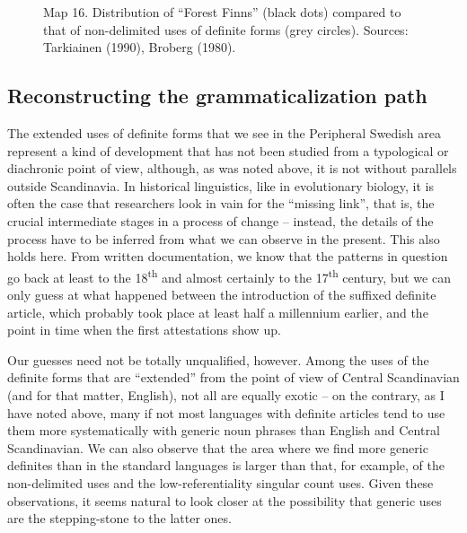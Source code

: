 \begin{figure}[h]
\centering
\begin{minipage}{6.58333in}
\label{bkm:Ref135469955}Map 16. Distribution of “Forest Finns” (black dots) compared to that of non-delimited uses\newline
 of definite forms (grey circles). Sources: Tarkiainen (1990), Broberg (1980).
\end{minipage}
\end{figure}
\clearpage\subsection[Reconstructing the grammaticalization path]{\rmfamily Reconstructing the grammaticalization path}
\label{bkm:Ref154983462}%
The extended uses of definite forms that we see in the Peripheral Swedish area represent a kind of development that has not been studied from a typological or diachronic point of view, although, as was noted above, it is not without parallels outside Scandinavia. In historical linguistics, like in evolutionary biology, it is often the case that researchers look in vain for the “missing link”, that is, the crucial intermediate stages in a process of change – instead, the details of the process have to be inferred from what we can observe in the present. This also holds here. From written documentation, we know that the patterns in question go back at least to the 18\textsuperscript{th} and almost certainly to the 17\textsuperscript{th} century, but we can only guess at what happened between the introduction of the suffixed definite article, which probably took place at least half a millennium earlier, and the point in time when the first attestations show up. 

Our guesses need not be totally unqualified, however. Among the uses of the definite forms that are “extended” from the point of view of Central Scandinavian (and for that matter, English), not all are equally exotic – on the contrary, as I have noted above, many if not most languages with definite articles tend to use them more systematically with generic noun phrases than English and Central Scandinavian. We can also observe that the area where we find more generic definites than in the standard languages is larger than that, for example, of the non-delimited uses and the low-referentiality singular count uses. Given these observations, it seems natural to look closer at the possibility that generic uses are the stepping-stone to the latter ones. 

